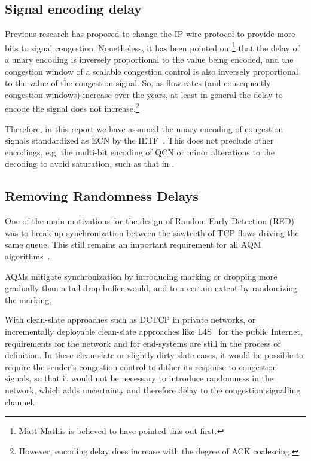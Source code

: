 \subsection{Signal encoding delay} Previous research has proposed to change the IP wire protocol to provide more bits to signal congestion. Nonetheless, it has been pointed out\footnote{Matt Mathis is believed to have pointed this out first.} that the delay of a unary encoding is inversely proportional to the value being encoded, and the congestion window of a scalable congestion control is also inversely proportional to the value of the congestion signal. So, as flow rates (and consequently congestion windows) increase over the years, at least in general the delay to encode the signal does not increase.\footnote{However, encoding delay does increase with the degree of ACK coalescing.}

Therefore, in this report we have assumed the unary encoding of congestion signals standardized as ECN by the IETF~\cite{IETF_RFC3168:ECN_IP_TCP}. This does not preclude other encodings, e.g. the multi-bit encoding of QCN or minor alterations to the decoding to avoid saturation, such as that in \cite{Briscoe17a:CC_Tensions_TR}.

\subsection{Removing Randomness Delays}\label{sec:rand_delay}

One of the main motivations for the design of Random Early Detection (RED)~\cite{Floyd93:RED} was to break up synchronization between the sawteeth of TCP flows driving the same queue. This still remains an important requirement for all AQM algorithms~\cite{Baker15:AQM_Recommendations}.

AQMs mitigate synchronization by introducing marking or dropping more gradually than a tail-drop buffer would, and to a certain extent by randomizing the marking. 

With clean-slate approaches such as DCTCP in private networks, or incrementally deployable clean-slate approaches like L4S~\cite{Briscoe16a:l4s-arch_ID} for the public Internet, requirements for the network and for end-systems are still in the process of definition. In these clean-slate or slightly dirty-slate cases, it would be possible to require the sender's congestion control to dither its response to congestion signals, so that it would not be necessary to introduce randomness in the network, which adds uncertainty and therefore delay to the congestion signalling channel. 

